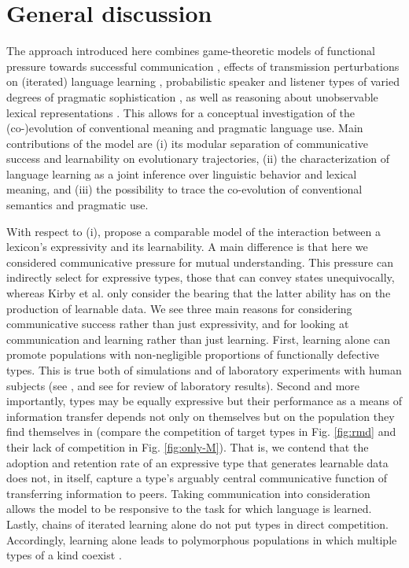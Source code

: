 \documentclass[a4paper, 11pt]{article}
\theoremstyle{Satz}
\begin{document}
\section{General discussion}\label{sec:discussion}
The approach introduced here combines game-theoretic models of functional pressure towards
successful communication \citep{nowak+krakauer:1999}, effects of transmission perturbations on
(iterated) language learning \citep{griffiths+kalish:2007}, probabilistic speaker and listener
types of varied degrees of pragmatic sophistication \citep{frank+goodman:2012,
  franke+jaeger:2014}, as well as reasoning about unobservable lexical representations
\citep{bergen+etal:2012,bergen+etal:2016}. This allows for a conceptual investigation of the
(co-)evolution of conventional meaning and pragmatic language use. Main contributions of the
model are (i) its modular separation of communicative success and learnability on evolutionary
trajectories, (ii) the characterization of language learning as a joint inference over
linguistic behavior and lexical meaning, and (iii) the possibility to trace the co-evolution of
conventional semantics and pragmatic use.

With respect to (i), \citet{kirby+etal:2015} propose a comparable model of the interaction
between a lexicon's expressivity and its learnability. A main difference is that here we
considered communicative pressure for mutual understanding. This pressure can indirectly select
for expressive types, those that can convey states unequivocally, whereas Kirby et al. only
consider the bearing that the latter ability has on the production of learnable data. We see
three main reasons for considering communicative success rather than just expressivity, and for
looking at communication and learning rather than just learning. First, learning alone can
promote populations with non-negligible proportions of functionally defective types. This is
true both of simulations and of laboratory experiments with human subjects (see
\citealt{kirby+etal:2008,silvey+etal:2014}, and see \citealt{fay+etal:2013} for review of
laboratory results). Second and more importantly, types may be equally expressive but their
performance as a means of information transfer depends not only on themselves but on the
population they find themselves in (compare the competition of target types in Fig.
\ref{fig:rmd} and their lack of competition in Fig. \ref{fig:only-M}). That is, we contend that
the adoption and retention rate of an expressive type that generates learnable data does not, in itself, capture a type's
arguably central communicative function of transferring information to peers. Taking
communication into consideration allows the model to be responsive to the task for which
language is learned. Lastly, chains of iterated learning alone do not put types in direct
competition. Accordingly, learning alone leads to polymorphous populations in which multiple types of
a kind coexist \citep{nowak:2006}.
\end{document}
